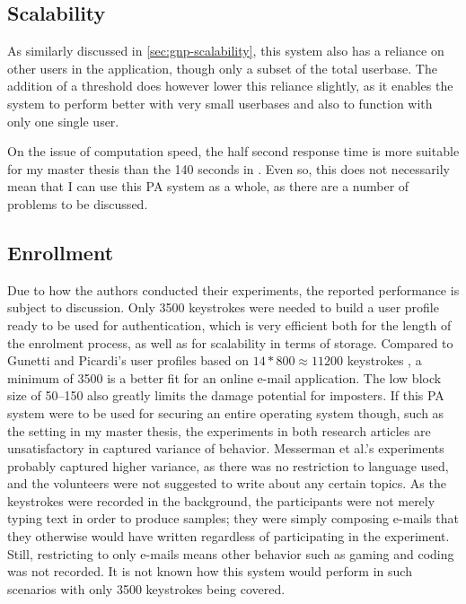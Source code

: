 \documentclass[informationsecurity]{gucmasterproject}
\begin{document}
\subsection{Scalability}
As similarly discussed in \cref{sec:gnp-scalability}, this system also has a reliance on other users in the application, though only a subset of the total userbase.
The addition of a threshold does however lower this reliance slightly, as it enables the system to perform better with very small userbases and also to function with only one single user.

On the issue of computation speed, the half second response time is more suitable for my master thesis than the 140 seconds in \cite{gnp}.
Even so, this does not necessarily mean that I can use this PA system as a whole, as there are a number of problems to be discussed.

\subsection{Enrollment}
Due to how the authors conducted their experiments, the reported performance is subject to discussion.
Only 3500 keystrokes were needed to build a user profile ready to be used for authentication, which is very efficient both for the length of the enrolment process, as well as for scalability in terms of storage.
Compared to Gunetti and Picardi's user profiles based on $14*800\approx{11200}$ keystrokes \cite{gnp}, a minimum of 3500 is a better fit for an online e-mail application.
The low block size of 50--150 also greatly limits the damage potential for imposters.
If this PA system were to be used for securing an entire operating system though, such as the setting in my master thesis, the experiments in both research articles \cite{gnp, Messerman} are unsatisfactory in captured variance of behavior.
Messerman et al.'s \cite{Messerman} experiments probably captured higher variance, as there was no restriction to language used, and the volunteers were not suggested to write about any certain topics.
As the keystrokes were recorded in the background, the participants were not merely typing text in order to produce samples; they were simply composing e-mails that they otherwise would have written regardless of participating in the experiment.
Still, restricting to only e-mails means other behavior such as gaming and coding was not recorded. 
It is not known how this system would perform in such scenarios with only 3500 keystrokes being covered.
\end{document}
